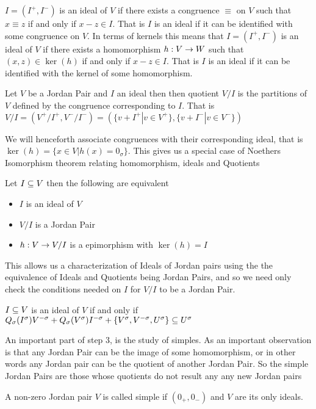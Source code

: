 \begin{definition}
    $I=(I^+,I^-)$ is an ideal of $V$ if there exists a congruence $\equiv$ on $V$ 
    such that $x\equiv z$ if and only if $x-z\in I$. That is $I$ is an ideal if it 
    can be identified with some congruence on $V$. 
    In terms of kernels this means that 
    $I=(I^+,I^-)$ is an ideal of $V$ if there exists a homomorphism $h: V\rightarrow W$ 
    such that $(x,z)\in \ker(h)$ if and only if $x-z\in I$. That is $I$ is an ideal if it 
    can be identified with the kernel of some homomorphism. 
\end{definition}
\begin{definition}
    Let $V$ be a Jordan Pair and $I$ an ideal then then quotient 
    $V/I$ is the partitions of $V$ defined by the congruence 
    corresponding to $I$. That is $V/I=(V^+/I^+,V^-/I^-)=(\{v+I^+|v\in V^+\},\{v+I^-|v\in V^-\})$
\end{definition}
We will henceforth associate congruences with their corresponding ideal, that is $\ker(h)=\{x\in V | h(x)=0_\sigma\}$.
This gives us a special case of Noethers Isomorphism theorem 
relating homomorphism, ideals and Quotients 
\begin{prop}
    Let $I\subseteq V$ then the following are equivalent
    \begin{itemize}
    \item $I$ is an ideal of $V$
    \item $V/I$ is a Jordan Pair
    \item $h:V\rightarrow V/I$ is a epimorphism with $\ker(h)=I$
    \end{itemize}
\end{prop}
This allows us a characterization of Ideals of Jordan pairs using the the equivalence of Ideals and Quotients being Jordan Pairs, and so we need only check the conditions needed on $I$ for $V/I$ to be a Jordan Pair.
\begin{prop}
$I\subseteq V$ is an ideal of $V$ if and only if $Q_\sigma(I^\sigma)V^{-\sigma}+Q_\sigma(V^\sigma)I^{-\sigma}+\{V^\sigma,V^{-\sigma},U^\sigma\}\subseteq U^\sigma$
\end{prop}
An important part of step 3, is the study of simples. As an important observation is that any Jordan Pair can be the image of some homomorphism, 
or in other words any Jordan pair can be the quotient of another Jordan Pair. So the simple Jordan Pairs are those whose quotients do not result any any new Jordan pairs
\begin{definition}
    A non-zero Jordan pair $V$ is called simple if $(0_+,0_-)$ and $V$ are its only ideals.
\end{definition}

